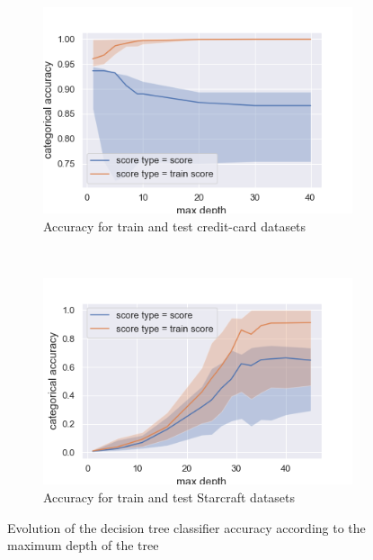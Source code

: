 \documentclass[10pt]{article}
\begin{document}
		\begin{figure}[]
			\centering
			\begin{subfigure}[]{0.45\columnwidth}
				\centering
				\includegraphics[width=\linewidth]{../graphics/tree_creditcard_max_depth_score_type_score_type.png}
				\caption{Accuracy for train and test credit-card datasets}
				\label{tree:cc_train_vs_test}
			\end{subfigure}
			~
			\begin{subfigure}[]{0.45\columnwidth}
				\centering
				\includegraphics[width=\linewidth]{../graphics/tree_starcraft_max_depth_score_type_score_type.png}
				\caption{Accuracy for train and test Starcraft datasets}
				\label{tree:sc_train_vs_test}
			\end{subfigure}
			\caption{Evolution of the decision tree classifier accuracy according to the maximum depth of the tree}
			\label{tree:train_vs_test}
		\end{figure}
\end{document}

